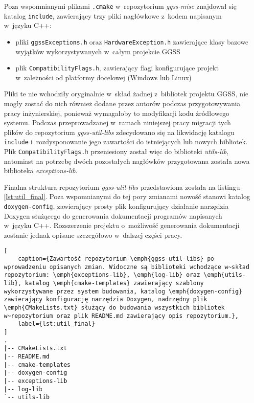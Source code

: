 Poza wspomnianymi plikami \lstinline{.cmake} w~repozytorium \emph{ggss-misc} znajdował się katalog \lstinline{include}, zawierający trzy pliki nagłówkowe z~kodem napisanym w~języku C++:
\begin{itemize}
    \item pliki \lstinline{ggssExceptions.h} oraz \lstinline{HardwareException.h} zawierające klasy bazowe wyjątków wykorzystywanych w~całym projekcie GGSS
    \item plik \lstinline{CompatibilityFlags.h}, zawierający flagi konfigurujące projekt w~zależności od platformy docelowej (Windows lub Linux)
\end{itemize}
Pliki te nie wchodziły oryginalnie w~skład żadnej z~bibliotek projektu GGSS, nie mogły zostać do nich również dodane przez autorów podczas przygotowywania pracy inżynierskiej, ponieważ wymagałoby to modyfikacji kodu źródłowego systemu. Podczas przeprowadzanej w~ramach niniejszej pracy migracji tych plików do repozytorium \emph{ggss-util-libs} zdecydowano się na likwidację katalogu \lstinline{include} i~rozdysponowanie jego zawartości do istniejących lub nowych bibliotek. Plik \lstinline{CompatibilityFlags.h} przeniesiony został więc do biblioteki \emph{utils-lib}, natomiast na potrzebę dwóch pozostałych nagłówków przygotowana została nowa biblioteka \emph{exceptions-lib}.

Finalna struktura repozytorium \emph{ggss-util-libs} przedstawiona została na listingu \ref{lst:util_final}. Poza wspomnianymi do tej pory zmianami nowość stanowi katalog \lstinline{doxygen-config}, zawierający prosty plik konfigurujący działanie narzędzia Doxygen \cite{doxygen} służącego do generowania dokumentacji programów napisanych w~języku C++. Rozszerzenie projektu o~możliwość generowania dokumentacji zostanie jednak opisane szczegółowo w~dalszej części pracy.

\begin{lstlisting}[
    caption={Zawartość repozytorium \emph{ggss-util-libs} po wprowadzeniu opisanych zmian. Widoczne są biblioteki wchodzące w~skład repozytorium: \emph{exceptions-lib}, \emph{log-lib} oraz \emph{utils-lib}, katalog \emph{cmake-templates} zawierający szablony wykorzystywane przez system budowania, katalog \emph{doxygen-config} zawierający konfigurację narzędzia Doxygen, nadrzędny plik \emph{CMakeLists.txt} służący do budowania wszystkich bibliotek w~repozytorium oraz plik README.md zawierający opis repozytorium.},
    label={lst:util_final}
]
.
|-- CMakeLists.txt
|-- README.md
|-- cmake-templates
|-- doxygen-config
|-- exceptions-lib
|-- log-lib
`-- utils-lib
\end{lstlisting}

